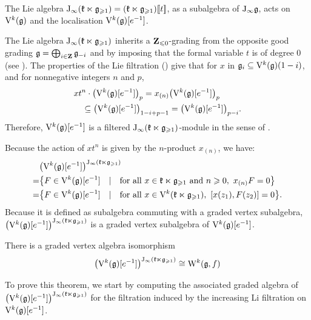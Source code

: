 The Lie algebra $\mathrm{J}_\infty(\mathfrak k \ltimes \mathfrak g_{\geqslant 1}) = (\mathfrak k \ltimes \mathfrak g_{\geqslant 1})[\![t]\!]$, as a subalgebra of $\mathrm{J}_\infty \mathfrak g$, acts on $\mathrm V^k(\mathfrak g)$ and the localisation $\mathrm V^k(\mathfrak g)[e^{-1}]$. 

The Lie algebra $\mathrm{J}_\infty(\mathfrak k \ltimes \mathfrak g_{\geqslant 1})$ inherits a $\mathbf{Z}_{\leqslant 0}$-grading from the opposite good grading $\mathfrak g = \bigoplus_{i \in \mathbf{Z}} \mathfrak g_{-i}$ and by imposing that the formal variable $t$ is of degree $0$ (see ). The properties of the Lie filtration () give that for $x$ in $\mathfrak g_i \subseteq \mathrm V^k(\mathfrak g)(1 - i)$, and for nonnegative integers $n$ and $p$,
\[ \begin{multlined}
	x t^n \cdot \big(\V^k(\g)[e^{-1}]\big)_p = x_{(n)} \big(\V^k(\g)[e^{-1}]\big)_p \\ \subseteq \big(\V^k(\g)[e^{-1}]\big)_{1 - i + p -1} = \big(\V^k(\g)[e^{-1}]\big)_{p - i}.
\end{multlined} \]
Therefore, $\mathrm V^k(\mathfrak g)[e^{-1}]$ is a filtered $\mathrm{J}_\infty(\mathfrak k \ltimes \mathfrak g_{\geqslant 1})$-module in the sense of .

Because the action of $x t^n$ is given by the $n$-product $x_{(n)}$, we have:
\[ \begin{aligned}
	& \big(\mathrm V^k(\mathfrak g)[e^{-1}] \big)^{\mathrm{J}_\infty(\mathfrak k \ltimes \mathfrak g_{\geqslant 1})} \\
	= & \big\{ F \in \mathrm V^k(\mathfrak g)[e^{-1}] \quad | \quad \text{for all} ~  x \in \mathfrak k \ltimes \mathfrak g_{\geqslant 1} ~\text{and} ~n \geqslant 0,  ~  x_{(n)} F = 0 \big\} \\
	= & \big\{ F \in \mathrm V^k(\mathfrak g)[e^{-1}] \quad | \quad \text{for all} ~  x \in \mathrm V^k(\mathfrak k \ltimes \mathfrak g_{\geqslant 1}),  ~   [x(z_1), F(z_2)] = 0 \big\}. 
\end{aligned} \]
Because it is defined as subalgebra commuting with a graded vertex subalgebra, $\big(\mathrm V^k(\mathfrak g)[e^{-1}] \big)^{\mathrm{J}_\infty(\mathfrak k \ltimes \mathfrak g_{\geqslant 1})}$ is a graded vertex subalgebra of $\mathrm V^k(\mathfrak g)[e^{-1}]$.

\begin{theorem} \label{theorem:affine-w-algebra-coset}
	There is a graded vertex algebra isomorphism
	\[ \big(\mathrm V^k(\mathfrak g)[e^{-1}]\big)^{\mathrm{J}_\infty(\mathfrak k \ltimes \mathfrak g_{\geqslant 1})} \cong \mathrm W^k(\mathfrak g, f) \]
\end{theorem}

To prove this theorem, we start by computing the associated graded algebra of $\big(\mathrm V^k(\mathfrak g)[e^{-1}]\big)^{\mathrm{J}_\infty(\mathfrak k \ltimes \mathfrak g_{\geqslant 1})}$ for the filtration induced by the increasing Li filtration on $\mathrm V^k(\mathfrak g)[e^{-1}]$.


